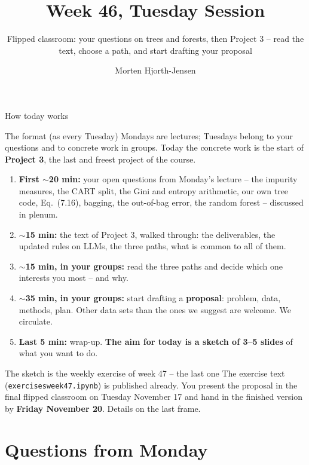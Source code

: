 \documentclass[10pt,aspectratio=169]{beamer}
\title{Week 46, Tuesday Session}
\subtitle{Flipped classroom: your questions on trees and forests, then
  Project 3 -- read the text, choose a path, and start drafting your
  proposal}
\author{Morten Hjorth-Jensen}
\institute{Department of Physics and Center for Computing in Science Education,\\
  University of Oslo, Norway}
\date{}
\begin{document}
\begin{frame}
\titlepage
\end{frame}

\begin{frame}{How today works}
\footnotesize
\begin{block}{The format (as every Tuesday)}
Mondays are lectures; Tuesdays belong to your questions and to concrete
work in groups.  Today the concrete work is the start of \textbf{Project 3},
the last and freest project of the course.
\end{block}
\begin{enumerate}
  \item \textbf{First $\sim$20 min:} your open questions from Monday's
        lecture -- the impurity measures, the CART split, the Gini and
        entropy arithmetic, our own tree code, Eq.~(7.16), bagging, the
        out-of-bag error, the random forest -- discussed in plenum.
  \item \textbf{$\sim$15 min:} the text of Project 3, walked through: the
        deliverables, the updated rules on LLMs, the three paths, what is
        common to all of them.
  \item \textbf{$\sim$15 min, in your groups:} read the three paths and
        decide which one interests you most -- and why.
  \item \textbf{$\sim$35 min, in your groups:} start drafting a
        \textbf{proposal}: problem, data, methods, plan.  Other data sets
        than the ones we suggest are welcome.  We circulate.
  \item \textbf{Last 5 min:} wrap-up.  \textbf{The aim for today is a sketch of
        3--5 slides} of what you want to do.
\end{enumerate}
\begin{block}{The sketch is the weekly exercise of week 47 -- the last one}
The exercise text (\texttt{exercisesweek47.ipynb}) is published already.  You
present the proposal in the final flipped classroom on Tuesday November 17
and hand in the finished version by \textbf{Friday November 20}.  Details on
the last frame.
\end{block}
\end{frame}

\section{Questions from Monday}
\end{document}
